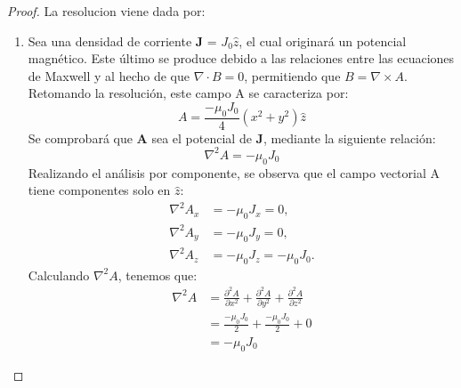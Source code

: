 \begin{proof} %
    La resolucion viene dada por:
    \begin{enumerate}
        \item Sea una densidad de corriente \textbf{J} = $J_0 \hat{z}$, el cual originará un potencial magnético. Este último se produce debido a las relaciones entre las ecuaciones de Maxwell y al hecho de que $\nabla \cdot B = 0$, permitiendo que $B = \nabla \times A$. Retomando la resolución, este campo A se caracteriza por:
            \begin{equation}
                A = \frac{-\mu_0 J_0}{4}(x^2 + y^2) \hat{z}
            \end{equation}
            Se comprobará que \textbf{A} sea el potencial de \textbf{J}, mediante la siguiente relación:
            \begin{equation}
                \nabla^2 A = -\mu_0 J_0
            \end{equation}
            Realizando el análisis por componente, se observa que el campo vectorial A tiene componentes solo en $\hat{z}$:
            \begin{align}
                \nabla^2 A_x &= -\mu_0 J_x = 0, \\
                \nabla^2 A_y &= -\mu_0 J_y = 0, \\
                \nabla^2 A_z &= -\mu_0 J_z = -\mu_0 J_0.
            \end{align}
            Calculando $\nabla^2 A$, tenemos que:
            \begin{equation}
                \begin{aligned}
                    \nabla^2 A &= \frac{\partial^2 A}{\partial x^2} + \frac{\partial^2 A}{\partial y^2} + \frac{\partial^2 A}{\partial z^2} \\
                               &= \frac{-\mu_0 J_0}{2} + \frac{-\mu_0 J_0}{2} + 0 \\
                               &= -\mu_0 J_0
                \end{aligned}
            \end{equation}
            

\end{enumerate}
\end{proof}
